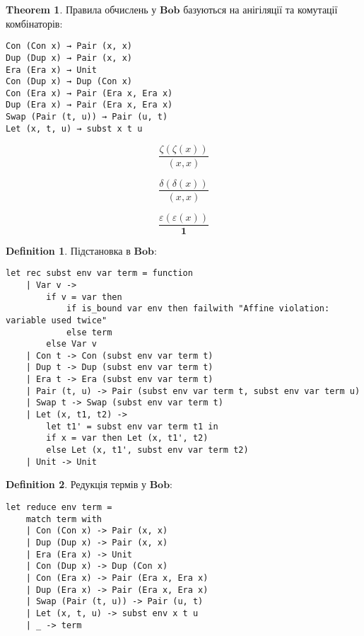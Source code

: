 \documentclass{article}
\theoremstyle{definition}
\newtheorem{theorem}{Theorem}
\newtheorem{definition}{Definition}
\begin{document}
\begin{theorem}
Правила обчислень у $\mathbf{Bob}$ базуються на анігіляції та комутації комбінаторів:
\begin{lstlisting}[mathescape=true]
Con (Con x) → Pair (x, x)
Dup (Dup x) → Pair (x, x)
Era (Era x) → Unit
Con (Dup x) → Dup (Con x)
Con (Era x) → Pair (Era x, Era x)
Dup (Era x) → Pair (Era x, Era x)
Swap (Pair (t, u)) → Pair (u, t)
Let (x, t, u) → subst x t u
\end{lstlisting}
\end{theorem}

\begin{equation}
\tag{$\zeta$-annihilation}
\dfrac
{\zeta (\zeta (x))}
{(x, x)}
\end{equation}

\begin{equation}
\tag{$\delta$-annihilation}
\dfrac
{\delta (\delta (x))}
{(x, x)}
\end{equation}

\begin{equation}
\tag{$\epsilon$-annihilation}
\dfrac
{\varepsilon (\varepsilon (x))}
{\mathbf{1}}
\end{equation}

\begin{definition}
Підстановка в $\mathbf{Bob}$:
\begin{lstlisting}[mathescape=true]
let rec subst env var term = function
    | Var v ->
        if v = var then
            if is_bound var env then failwith "Affine violation: variable used twice"
            else term
        else Var v
    | Con t -> Con (subst env var term t)
    | Dup t -> Dup (subst env var term t)
    | Era t -> Era (subst env var term t)
    | Pair (t, u) -> Pair (subst env var term t, subst env var term u)
    | Swap t -> Swap (subst env var term t)
    | Let (x, t1, t2) ->
        let t1' = subst env var term t1 in
        if x = var then Let (x, t1', t2)
        else Let (x, t1', subst env var term t2)
    | Unit -> Unit
\end{lstlisting}
\end{definition}

\begin{definition}
Редукція термів у $\mathbf{Bob}$:
\begin{lstlisting}[mathescape=true]
let reduce env term =
    match term with
    | Con (Con x) -> Pair (x, x)
    | Dup (Dup x) -> Pair (x, x)
    | Era (Era x) -> Unit
    | Con (Dup x) -> Dup (Con x)
    | Con (Era x) -> Pair (Era x, Era x)
    | Dup (Era x) -> Pair (Era x, Era x)
    | Swap (Pair (t, u)) -> Pair (u, t)
    | Let (x, t, u) -> subst env x t u
    | _ -> term
\end{lstlisting}
\end{definition}
\end{document}
